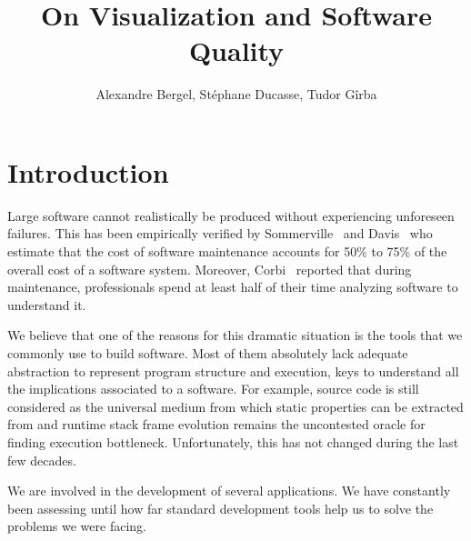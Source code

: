 \documentclass[runningheads]{llncs}
\newcommand{\Title}{On Visualization and Software Quality}
\newcommand{\TitleShort}{\Title}
\newcommand{\Authors}{Alexandre Bergel, St\'ephane Ducasse, Tudor G\^irba}
\newcommand{\AuthorsShort}{A. Bergel}
\begin{document}
\title{\Title}

\author{\Authors%
} 

\maketitle


\begin{abstract}
\end{abstract}


\section{Introduction}

Large software cannot realistically be produced without experiencing unforeseen failures.
This has been empirically verified by Sommerville~\cite{Somm00a} and Davis~\cite{Davi95a} who estimate that the cost of software maintenance accounts for 50\% to 75\% of the overall cost of a software system. Moreover, Corbi~\cite{Corb89a} reported that during maintenance, professionals spend at least half of their time analyzing software to understand it. 



We believe that one of the reasons for this dramatic situation is the tools that we commonly use to build software. Most of them absolutely lack adequate abstraction to represent program structure and execution, keys to understand all the implications associated to a software. For example, source code is still considered as the universal medium from which static properties can be extracted from and runtime stack frame evolution remains the uncontested oracle for finding execution bottleneck. Unfortunately, this has not changed during the last few decades.

We are involved in the development of several applications. We have constantly been assessing until how far standard development tools help us to solve the problems we were facing. 
\end{document}
